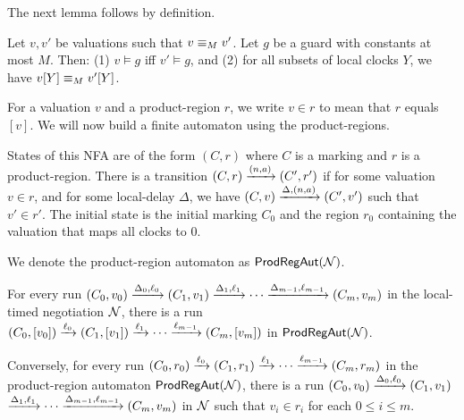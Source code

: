 The next lemma follows by definition.
\begin{lemma}\label{lem:region-guard-reset}
  Let $v, v'$ be valuations such that $v \equiv_M v'$. Let $g$ be a guard
  with constants at most $M$. Then: (1) $v \models g$ iff
  $v' \models g$, and (2) for all subsets of local clocks $Y$, we have
  $v[Y] \equiv_M v'[Y]$.
\end{lemma}

For a valuation $v$ and a product-region $r$, we write $v \in r$ to
mean that $r$ equals $[v]$. We will now build a finite automaton using
the product-regions. 


\begin{definition}\label{def:prod-reg-aut}
  States of this NFA are of the form $(C, r)$ where $C$ is a marking
  and $r$ is a product-region. There is a transition
  $(C, r) \xrightarrow{(n, a)} (C', r')$ if for some valuation $v \in r$, and
  for some local-delay $\Delta$, we have
  $(C, v) \xrightarrow{\Delta, (n, a)} (C', v')$ such that $v' \in r'$. The
  initial state is the initial marking $C_0$ and the region $r_0$
  containing the valuation that maps all clocks to $0$.

  We denote the product-region automaton as $\mathsf{ProdRegAut}(\mathcal{N})$.
\end{definition}

\begin{lemma}\label{lem:reg-prod-reg-equiv}
  For every run
  $(C_0, v_0) \xrightarrow{\Delta_0, \ell_0} (C_1, v_1) \xrightarrow{\Delta_1, \ell_1}
  \cdots \xrightarrow{\Delta_{m-1}, \ell_{m-1}} (C_m, v_m)$ in the local-timed
  negotiation $\mathcal{N}$, there is a run
  $(C_0, [v_0]) \xrightarrow{\ell_0} (C_1, [v_1]) \xrightarrow{\ell_1} \cdots
  \xrightarrow{\ell_{m-1}} (C_m, [v_m])$ in $\mathsf{ProdRegAut}(\mathcal{N})$. 

  Conversely, for every run
  $(C_0, r_0) \xrightarrow{\ell_0} (C_1, r_1) \xrightarrow{\ell_1} \cdots
  \xrightarrow{\ell_{m-1}} (C_m, r_m)$ in the product-region automaton
  $\mathsf{ProdRegAut}(\mathcal{N})$, there is a run
  $(C_0, v_0) \xrightarrow{\Delta_0, \ell_0} (C_1, v_1)$
  $\xrightarrow{\Delta_1, \ell_1} \cdots \xrightarrow{\Delta_{m-1}, \ell_{m-1}} (C_m,
  v_m)$ in $\mathcal{N}$ such that $v_i \in r_i$ for each $0 \le i \le m$.
\end{lemma}



